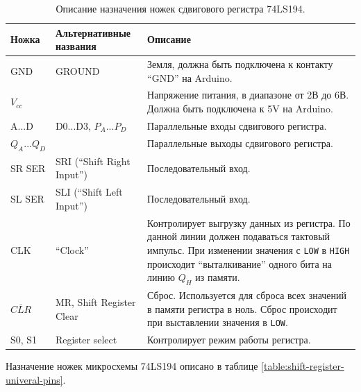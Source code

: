 \documentclass[../sparc.tex]{subfiles}
\begin{document}
\begin{table}[H]
  \centering
  \small
  \begin{tabular}{ | m{1.2cm} | m{2.55cm} | m{6.75cm} | }
    \hline
    \textbf{Ножка}
    & \textbf{Альтернативные названия}
    & \textbf{Описание} \\
    \hline
    GND
    & GROUND
    & Земля, должна быть подключена к контакту ``GND'' на Arduino. \\
    \hline
    $V_{cc}$
    &
    & Напряжение питания, в диапазоне от 2В до 6В.
    Должна быть подключена к 5V на Arduino. \\
    \hline
    A...D
    & D0...D3, $P_{A}...P_{D}$
    & Параллельные входы сдвигового регистра. \\
    \hline
    $Q_{A}...Q_{D}$
    &
    & Параллельные выходы сдвигового регистра. \\
    \hline
    SR SER
    & SRI (``Shift Right Input'')
    & Последовательный вход. \\
    \hline
    SL SER
    & SLI (``Shift Left Input'')
    & Последовательный вход. \\
    \hline
    CLK
    & ``Clock''
    & Контролирует выгрузку данных из регистра.  По данной линии должен
    подаваться тактовый импульс.  При изменении значения с \texttt{LOW} в
    \texttt{HIGH} происходит ``выталкивание'' одного бита на линию $Q_H$
    из памяти. \\
    \hline
    $\overline{CLR}$
    & MR, Shift Register Clear
    & Сброс.  Используется для сброса всех значений в памяти регистра в ноль.
    Сброс происходит при выставлении значения в \texttt{LOW}. \\
    \hline
    S0, S1
    &  Register select
    &  Контролирует режим работы регистра.\\
    \hline
  \end{tabular}
  \caption{Описание назначения ножек сдвигового регистра 74LS194.}
  \label{table:shift-register-universal-pins}
\end{table}

Назначение ножек микросхемы 74LS194 описано в таблице
\ref{table:shift-register-univeral-pins}.
\end{document}
